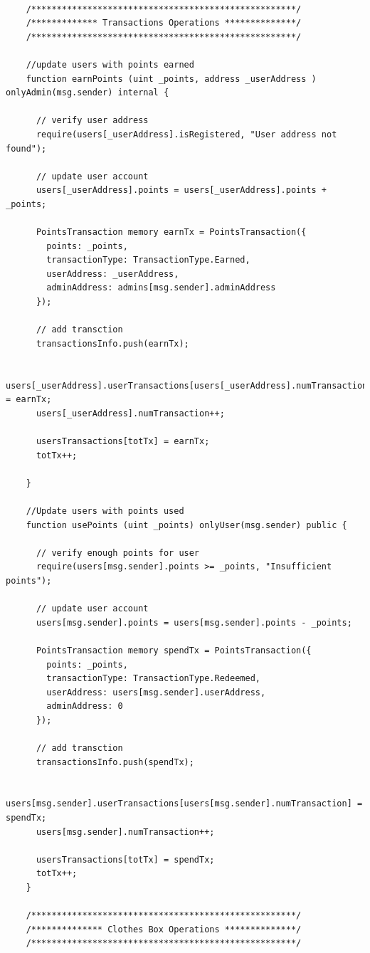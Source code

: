 \begin{lstlisting}[language=Solidity]
    
    /****************************************************/
    /************* Transactions Operations **************/
    /****************************************************/

    //update users with points earned
    function earnPoints (uint _points, address _userAddress ) onlyAdmin(msg.sender) internal {

      // verify user address
      require(users[_userAddress].isRegistered, "User address not found");

      // update user account
      users[_userAddress].points = users[_userAddress].points + _points;

      PointsTransaction memory earnTx = PointsTransaction({
        points: _points,
        transactionType: TransactionType.Earned,
        userAddress: _userAddress,
        adminAddress: admins[msg.sender].adminAddress
      });

      // add transction
      transactionsInfo.push(earnTx);

      users[_userAddress].userTransactions[users[_userAddress].numTransaction] = earnTx;
      users[_userAddress].numTransaction++;

      usersTransactions[totTx] = earnTx;
      totTx++;

    }

    //Update users with points used
    function usePoints (uint _points) onlyUser(msg.sender) public {

      // verify enough points for user
      require(users[msg.sender].points >= _points, "Insufficient points");

      // update user account
      users[msg.sender].points = users[msg.sender].points - _points;

      PointsTransaction memory spendTx = PointsTransaction({
        points: _points,
        transactionType: TransactionType.Redeemed,
        userAddress: users[msg.sender].userAddress,
        adminAddress: 0
      });

      // add transction
      transactionsInfo.push(spendTx);

      users[msg.sender].userTransactions[users[msg.sender].numTransaction] = spendTx;
      users[msg.sender].numTransaction++;

      usersTransactions[totTx] = spendTx;
      totTx++;
    }

    /****************************************************/
    /************** Clothes Box Operations **************/
    /****************************************************/


\end{lstlisting}

